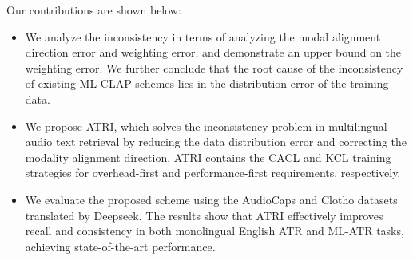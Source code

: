 Our contributions are shown below:
\begin{itemize}
    \item We analyze the inconsistency in terms of analyzing the modal alignment direction error and weighting error, and demonstrate an upper bound on the weighting error. We further conclude that the root cause of the inconsistency of existing ML-CLAP schemes lies in the distribution error of the training data.
    \item We propose ATRI, which solves the inconsistency problem in multilingual audio text retrieval by reducing the data distribution error and correcting the modality alignment direction. ATRI contains the CACL and KCL training strategies for overhead-first and performance-first requirements, respectively.
    \item We evaluate the proposed scheme using the AudioCaps and Clotho datasets translated by Deepseek. The results show that ATRI effectively improves recall and consistency in both monolingual English ATR and ML-ATR tasks, achieving state-of-the-art performance.
\end{itemize}

